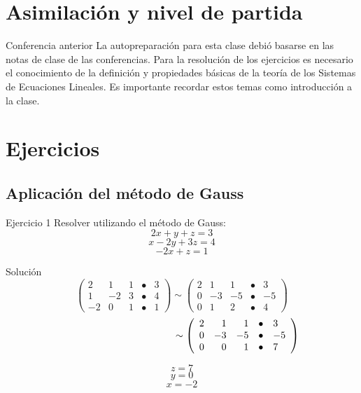 \documentclass{beamer}
\begin{document}
\section{Asimilación y nivel de partida}
\begin{frame}{Conferencia anterior}
  La autopreparación para esta clase debió basarse en las notas de clase de las
  conferencias. Para la resolución de los ejercicios es necesario el conocimiento de la definición y
  propiedades básicas de la teoría de los Sistemas de Ecuaciones Lineales. Es importante
  recordar estos temas como introducción a la clase.
\end{frame}

\section{Ejercicios}
\subsection{Aplicación del método de Gauss}
\begin{frame}
  {Ejercicio 1} Resolver utilizando el método de Gauss:          $$2x+y+z=3$$
  $$x-2y+3z=4$$
  $$-2x+z=1$$

\end{frame}
\begin{frame}{Solución}
  $$\left(
    \begin{array}{rrrrl}
        2  & 1  & 1 & \bullet & 3 \\
        1  & -2 & 3 & \bullet & 4 \\
        -2 & 0  & 1 & \bullet & 1
      \end{array}
    \right) \sim \left(
    \begin{array}{rrrrl}
        2 & 1  & 1  & \bullet & 3  \\
        0 & -3 & -5 & \bullet & -5 \\
        0 & 1  & 2  & \bullet & 4
      \end{array}
    \right)$$
  $$\hspace*{4cm}
    \sim \left(
    \begin{array}{rrrrl}
        2 & 1  & 1  & \bullet & 3  \\
        0 & -3 & -5 & \bullet & -5 \\
        0 & 0  & 1  & \bullet & 7
      \end{array}
    \right)$$

  $$z=7$$
  $$y=0$$
  $$x=-2$$
\end{frame}
\end{document}

